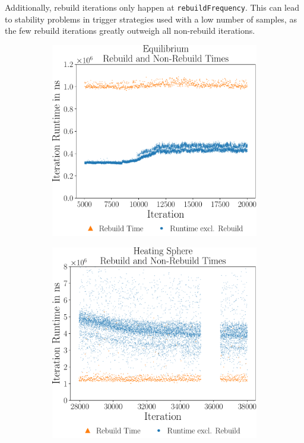 Additionally, rebuild iterations only happen at \texttt{rebuildFrequency}. This can lead to stability problems in trigger strategies used with a low number of samples, as the few rebuild iterations greatly outweigh all non-rebuild iterations.

\begin{figure}[htpb]
	\centering
	\begin{subfigure}[t]{0.45\textwidth}
		\vskip0pt
		\centering
		\includegraphics[width=\textwidth]{./Figures/plots/equilibrium_rebuild.pdf}
	\end{subfigure}
	\hfill
	\begin{subfigure}[t]{0.45\textwidth}
		\vskip0pt
		\centering
		\includegraphics[width=\textwidth]{./Figures/plots/hs_rebuild.pdf}

\end{subfigure}
\end{figure}
